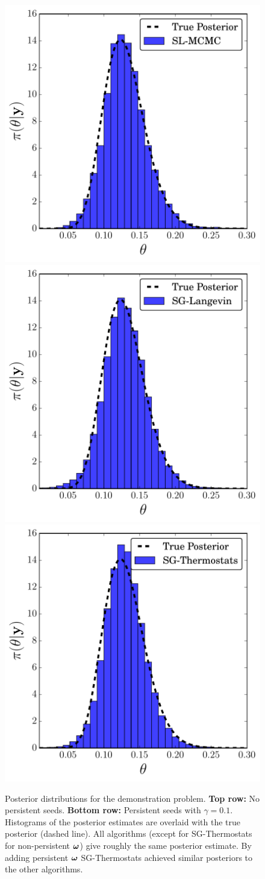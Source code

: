 \documentclass[]{article}
\begin{document}
\begin{figure}[t]
\begin{center}
\includegraphics[width=0.32\columnwidth]{./images/exponential/exp2-SL-MCMC-posterior-hist-omega-rate-0p1-chain1.pdf}
\includegraphics[width=0.32\columnwidth]{./images/exponential/exp2-SG-Langevin-posterior-hist-omega-rate-0p1-chain0.pdf}
\includegraphics[width=0.32\columnwidth]{./images/exponential/exp2-SG-Thermostats-posterior-hist-omega-rate-0p1-chain1.pdf}

\caption{\small{Posterior distributions for the demonstration problem.  {\bf Top row:} No persistent seeds.  {\bf Bottom row:} Persistent seeds with $\gamma=0.1$.  Histograms of the posterior estimates are overlaid with the true posterior (dashed line).  All algorithms (except for SG-Thermostats for non-persistent ${\bm \omega}$) give roughly the same posterior estimate.  By adding persistent ${\bm \omega}$ SG-Thermostats achieved similar posteriors to the other algorithms.}}
\label{fig:exp-posteriors}
\end{center}
\vskip -0.2in
\end{figure} 
\end{document}
